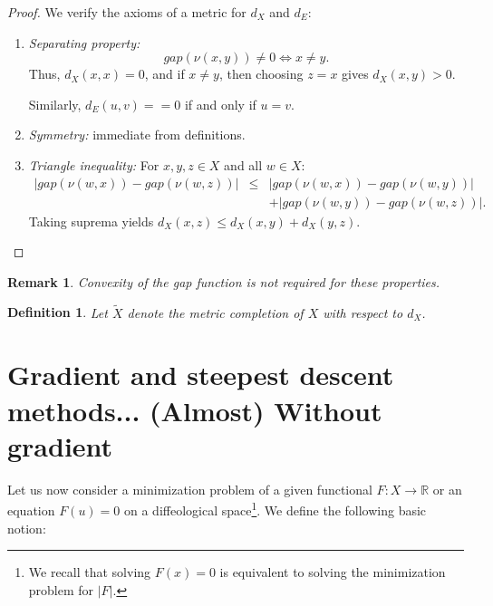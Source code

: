 \documentclass{amsart}
\def\R{\mathbb{R}}
\newcounter{thm}
\newcounter{ex}
\newcounter{re}
\newtheorem{remark}[thm]{Remark}
\newtheorem{Definition}[thm]{Definition}
\begin{document}
\begin{proof}
	We verify the axioms of a metric for $d_X$ and $d_E$:
	
	\begin{enumerate}
		\item \emph{Separating property:}
		\[
		gap(\nu(x,y)) \neq 0 \iff x \neq y.
		\]
		Thus, $d_X(x,x) = 0$, and if $x \neq y$, then choosing $z = x$ gives $d_X(x,y) > 0$.
		
		Similarly, $d_E(u,v) = = 0$ if and only if $u = v$.
		
		\item \emph{Symmetry:} immediate from definitions.
		
		\item \emph{Triangle inequality:} For $x,y,z \in X$ and all $w \in X$:
		\begin{eqnarray*}
		\left| gap(\nu(w,x)) - gap(\nu(w,z)) \right| 
		&\leq &\left| gap(\nu(w,x)) - gap(\nu(w,y)) \right| \\
        &&+ \left| gap(\nu(w,y)) - gap(\nu(w,z)) \right|.
		\end{eqnarray*}
		Taking suprema yields $d_X(x,z) \leq d_X(x,y) + d_X(y,z)$.
		\end{enumerate}
	\end{proof}

{\color{blue}
\begin{remark}
Convexity of the gap function is not required for these properties.
\end{remark}}

\begin{Definition}
Let $\tilde{X}$ denote the metric completion of $X$ with respect to $d_X$.
\end{Definition}

\section{Gradient and steepest descent methods... (Almost) Without gradient}

Let us now consider a minimization problem of a given functional $F: X \rightarrow \R$ or an equation $F(u) = 0$ on a diffeological space\footnote{We recall that solving $F(x)=0$ is equivalent to solving the minimization problem for $|F|.$}. We define the following basic notion:
\end{document}
